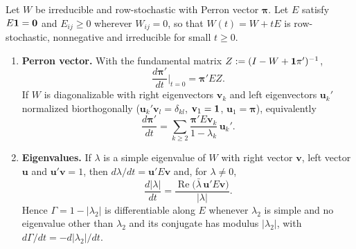 \documentclass[../structural_economics_book.tex]{subfiles}
\begin{document}
\begin{lemma}\label{ch06:lem:perturbation}
Let $W$ be irreducible and row-stochastic with Perron vector $\boldsymbol{\pi}$. Let $E$ satisfy $E\mathbf{1} = \mathbf{0}$ and $E_{ij} \geq 0$ wherever $W_{ij} = 0$, so that $W(t) = W + tE$ is row-stochastic, nonnegative and irreducible for small $t \geq 0$.
\begin{enumerate}
\item \textbf{Perron vector.} With the fundamental matrix $Z := (I - W + \mathbf{1}\pi')^{-1}$,
\begin{equation}\label{ch06:eq:dpi}
\frac{d\boldsymbol{\pi}'}{dt}\Big|_{t=0} = \boldsymbol{\pi}'EZ .
\end{equation}
If $W$ is diagonalizable with right eigenvectors $\mathbf{v}_k$ and left eigenvectors $\mathbf{u}_k'$ normalized biorthogonally ($\mathbf{u}_k'\mathbf{v}_l = \delta_{kl}$, $\mathbf{v}_1 = \mathbf{1}$, $\mathbf{u}_1 = \boldsymbol{\pi}$), equivalently
\begin{equation}\label{ch06:eq:dpi_eig}
\frac{d\boldsymbol{\pi}'}{dt} = \sum_{k \geq 2} \frac{\boldsymbol{\pi}'E\mathbf{v}_k}{1 - \lambda_k}\,\mathbf{u}_k' .
\end{equation}
\item \textbf{Eigenvalues.} If $\lambda$ is a simple eigenvalue of $W$ with right vector $\mathbf{v}$, left vector $\mathbf{u}$ and $\mathbf{u}'\mathbf{v} = 1$, then $d\lambda/dt = \mathbf{u}'E\mathbf{v}$ and, for $\lambda \neq 0$,
\begin{equation}\label{ch06:eq:dabs}
\frac{d|\lambda|}{dt} = \frac{\operatorname{Re}\bigl(\bar{\lambda}\,\mathbf{u}'E\mathbf{v}\bigr)}{|\lambda|} .
\end{equation}
Hence $\Gamma = 1 - |\lambda_2|$ is differentiable along $E$ whenever $\lambda_2$ is simple and no eigenvalue other than $\lambda_2$ and its conjugate has modulus $|\lambda_2|$, with $d\Gamma/dt = -d|\lambda_2|/dt$.
\end{enumerate}
\end{lemma}
\end{document}
